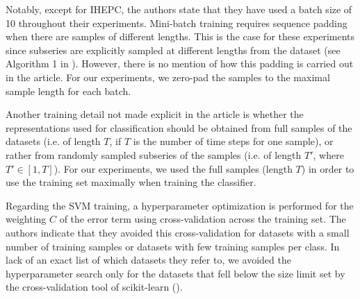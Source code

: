 \documentclass{article}
\begin{document}
Notably, except for IHEPC, the authors state that they have used a batch size of 10 throughout their experiments. Mini-batch training requires sequence padding when there are samples of different lengths. This is the case for these experiments since subseries are explicitly sampled at different lengths from the dataset (see Algorithm 1 in \cite{FranceschiUnsupervised2019}). However, there is no mention of how this padding is carried out in the article. For our experiments, we zero-pad the samples to the maximal sample length for each batch.




Another training detail not made explicit in the article is whether the representations used for classification should be obtained from full samples of the datasets (i.e. of length $T$, if $T$ is the number of time steps for one sample), or rather from randomly sampled subseries of the samples (i.e. of length $T'$, where $T' \in [1,T]$). For our experiments, we used the full samples (length $T$) in order to use the training set maximally when training the classifier.

Regarding the SVM training, a hyperparameter optimization is performed for the weighting $C$ of the error term using cross-validation across the training set. The authors indicate that they avoided this cross-validation for datasets with a small number of training samples or datasets with few training samples per class. In lack of an exact list of which datasets they refer to, we avoided the hyperparameter search only for the datasets that fell below the size limit set by the cross-validation tool of scikit-learn (\cite{scikit-learn}).
\end{document}
